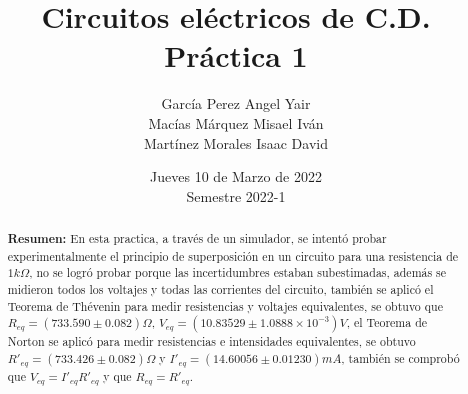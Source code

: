 \documentclass[DIV=calc, paper=a4, fontsize=11pt]{scrartcl}
\title{Circuitos eléctricos de C.D.\\ %
Práctica 1}
\author{García Perez Angel Yair\\
Macías Márquez Misael Iván \\
Martínez Morales Isaac David }
\date{Jueves 10 de Marzo de 2022\\Semestre 2022-1}
\begin{document}
\maketitle


\begin{abstract}
 
\textbf{Resumen:} 
En esta practica, a través de un simulador, se intentó probar experimentalmente el principio de superposición en un circuito para una resistencia de $1k\Omega $, no se logró probar porque las incertidumbres estaban subestimadas, además se midieron todos los voltajes y todas las corrientes del circuito, también se aplicó el Teorema de Thévenin para medir resistencias y voltajes equivalentes, se obtuvo que $R_{eq}=(733.590\pm0.082) \Omega$, $V_{eq}=(10.83529\pm1.0888\times10^{-3})V$, el Teorema de Norton se aplicó para medir resistencias e intensidades equivalentes, se obtuvo $R'_{eq}=(733.426\pm0.082) \Omega$ y $I'_{eq}=(14.60056\pm 0.01230)m A$, también se comprobó que $V_{eq}=I'_{eq}R'_{eq}$ y que $R_{eq}=R'_{eq}$.

\end{abstract}
\end{document}
